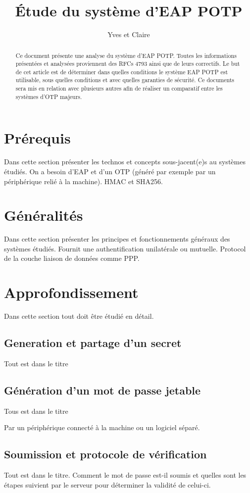 \documentclass{../res/univ-projet}
\title{\'Etude du syst\`eme d'EAP POTP}
\author{Yves et Claire}
\begin{document}
\maketitle

\begin{abstract}
Ce document présente une analyse du système d'EAP POTP. Toutes les informations présentées et analysées proviennent des RFCs 4793 ainsi que de leurs
correctifs. Le but de cet article est de déterminer dans quelles conditions le système EAP POTP est utilisable, sous quelles conditions et avec quelles garanties de sécurité.
Ce documents sera mis en relation avec plusieurs autres afin de réaliser un comparatif entre les systèmes d'OTP majeurs.
\end{abstract}
\newpage
\tableofcontents
\newpage

\section{Prérequis}
Dans cette section présenter les technos et concepts sous-jacent(e)s au systèmes étudiés.
On a besoin d'EAP et d'un OTP (généré par exemple par un périphérique relié à la machine).
HMAC et SHA256.

\section{Généralités}
Dans cette section présenter les principes et fonctionnements généraux des systèmes étudiés.
Fournit une authentification unilatérale ou mutuelle.
Protocol de la couche liaison de données comme PPP.

\section{Approfondissement}
  Dans cette section tout doit \^etre étudié en détail.
  \subsection{Generation et partage d'un secret}
  Tout est dans le titre
  
  \subsection{Génération d'un mot de passe jetable}
  Tous est dans le titre
  
  Par un périphérique connecté à la machine ou un logiciel séparé.
  
  \subsection{Soumission et protocole de vérification}
  Tout est dans le titre. Comment le mot de passe est-il soumis et quelles sont les étapes suivient par le serveur pour déterminer la validité de celui-ci.
  
\end{document}
